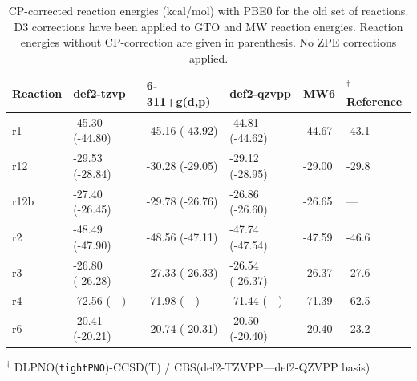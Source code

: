 \documentclass[11pt,a4paper]{article}
\begin{document}
\begin{table}[H]
	\centering
	\label{tab: rxn energies old pbe0}
	\caption{CP-corrected reaction energies (\si{kcal/mol}) with PBE0 for the old set of reactions. D3 corrections have been applied to GTO and MW reaction energies. Reaction energies without CP-correction are given in parenthesis. No ZPE corrections applied.}
	\begin{threeparttable}
	\begin{tabular}{l l l l l l}
		\toprule
		Reaction & def2-tzvp       & 6-311+g(d,p)    & def2-qzvpp      & MW6    & $^\dagger$Reference \parencite{dohm2018} \\ 
		\midrule
		r1       & -45.30 (-44.80) & -45.16 (-43.92) & -44.81 (-44.62) & -44.67 & -43.1                          \\
		r12      & -29.53 (-28.84) & -30.28 (-29.05) & -29.12 (-28.95) & -29.00 & -29.8                          \\
		r12b     & -27.40 (-26.45) & -29.78 (-26.76) & -26.86 (-26.60) & -26.65 & ---                               \\
		r2       & -48.49 (-47.90) & -48.56 (-47.11) & -47.74 (-47.54) & -47.59 & -46.6                          \\
		r3       & -26.80 (-26.28) & -27.33 (-26.33) & -26.54 (-26.37) & -26.37 & -27.6                          \\
		r4       & -72.56 (---)    & -71.98 (---)    & -71.44 (---)    & -71.39 & -62.5                          \\
		r6       & -20.41 (-20.21) & -20.74 (-20.31) & -20.50 (-20.40) & -20.40 & -23.2                          \\ 
		\bottomrule
	\end{tabular}
\begin{tablenotes}
	\item $^\dagger$ DLPNO(\verb|tightPNO|)-CCSD(T) / CBS(def2-TZVPP---def2-QZVPP basis)
\end{tablenotes}

\end{threeparttable}
\end{table}
	

\printbibliography

%
\end{document}
